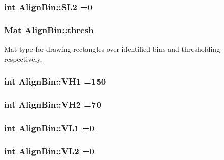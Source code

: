 \subsubsection[{\texorpdfstring{S\+L2}{SL2}}]{\setlength{\rightskip}{0pt plus 5cm}int Align\+Bin\+::\+S\+L2 =0}\hypertarget{classAlignBin_af75c44f0d561a2052044bab2edd8b54b}{}\label{classAlignBin_af75c44f0d561a2052044bab2edd8b54b}
\subsubsection[{\texorpdfstring{thresh}{thresh}}]{\setlength{\rightskip}{0pt plus 5cm}Mat Align\+Bin\+::thresh}\hypertarget{classAlignBin_a798e130d7fb332d98fc23f628b62b6ab}{}\label{classAlignBin_a798e130d7fb332d98fc23f628b62b6ab}


Mat type for drawing rectangles over identified bins and thresholding respectively. 

\subsubsection[{\texorpdfstring{V\+H1}{VH1}}]{\setlength{\rightskip}{0pt plus 5cm}int Align\+Bin\+::\+V\+H1 =150}\hypertarget{classAlignBin_a7c8ef2534ea4a97c0bb68468cda0a5f7}{}\label{classAlignBin_a7c8ef2534ea4a97c0bb68468cda0a5f7}
\subsubsection[{\texorpdfstring{V\+H2}{VH2}}]{\setlength{\rightskip}{0pt plus 5cm}int Align\+Bin\+::\+V\+H2 =70}\hypertarget{classAlignBin_a46ca3a67b1c4ae0a99c76ee620c72738}{}\label{classAlignBin_a46ca3a67b1c4ae0a99c76ee620c72738}
\subsubsection[{\texorpdfstring{V\+L1}{VL1}}]{\setlength{\rightskip}{0pt plus 5cm}int Align\+Bin\+::\+V\+L1 =0}\hypertarget{classAlignBin_acb43ad409fe61135fe1eba9c0347f3e9}{}\label{classAlignBin_acb43ad409fe61135fe1eba9c0347f3e9}
\subsubsection[{\texorpdfstring{V\+L2}{VL2}}]{\setlength{\rightskip}{0pt plus 5cm}int Align\+Bin\+::\+V\+L2 =0}\hypertarget{classAlignBin_a0a7000cecbb77704fb06e3d8112e131e}{}\label{classAlignBin_a0a7000cecbb77704fb06e3d8112e131e}


